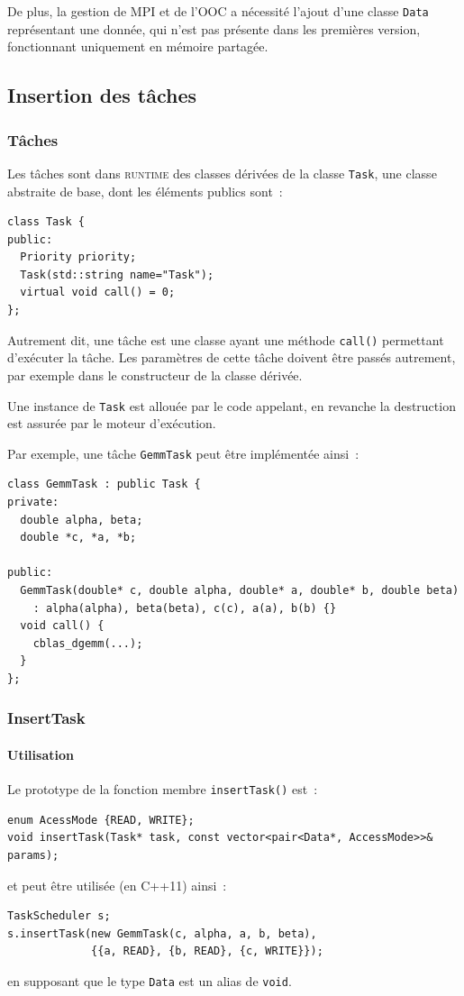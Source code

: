 \documentclass[11pt]{article}
\theoremstyle{plain} %
\theoremstyle{definition} %
\begin{document}
De plus, la gestion de MPI et de l'OOC a nécessité l'ajout d'une classe \texttt{Data} représentant une donnée, qui n'est pas présente dans les premières version, fonctionnant uniquement en mémoire partagée.

\subsection{Insertion des tâches}
\label{sec:insertion-des-taches}

\subsubsection{Tâches}
\label{sec:taches}
Les tâches sont dans \textsc{runtime} des classes dérivées de la classe \texttt{Task}, une classe abstraite de base, dont les éléments publics sont~:~
\begin{lstlisting}
class Task {
public:
  Priority priority;
  Task(std::string name="Task");
  virtual void call() = 0;
};
\end{lstlisting}
Autrement dit, une tâche est une classe ayant une méthode \texttt{call()} permettant d'exécuter la tâche.
Les paramètres de cette tâche doivent être passés autrement, par exemple dans le constructeur de la classe dérivée.

Une instance de \texttt{Task} est allouée par le code appelant, en revanche la destruction est assurée par le moteur d'exécution.

Par exemple, une tâche \texttt{GemmTask} peut être implémentée ainsi~:
\begin{lstlisting}
class GemmTask : public Task {
private:
  double alpha, beta;
  double *c, *a, *b;

public:
  GemmTask(double* c, double alpha, double* a, double* b, double beta)
    : alpha(alpha), beta(beta), c(c), a(a), b(b) {}
  void call() {
    cblas_dgemm(...);
  }
};
\end{lstlisting}

\subsubsection{InsertTask}
\label{sec:inserttask}

\paragraph{Utilisation}
\label{sec:utilisation}
Le prototype de la fonction membre \texttt{insertTask()} est~:~
\begin{lstlisting}
enum AcessMode {READ, WRITE};
void insertTask(Task* task, const vector<pair<Data*, AccessMode>>& params);
\end{lstlisting}
et peut être utilisée (en C++11) ainsi~:
\begin{lstlisting}
TaskScheduler s;
s.insertTask(new GemmTask(c, alpha, a, b, beta),
             {{a, READ}, {b, READ}, {c, WRITE}});
\end{lstlisting}
en supposant que le type \texttt{Data} est un alias de \texttt{void}.
\end{document}

